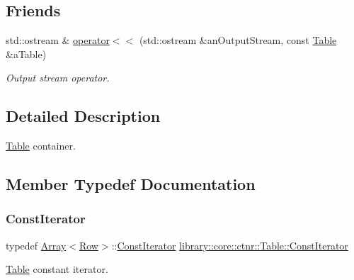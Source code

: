 \subsection*{Friends}
\begin{DoxyCompactItemize}
\item 
std\+::ostream \& \hyperlink{classlibrary_1_1core_1_1ctnr_1_1_table_afaece709b2f143e4011941ae67b7adba}{operator$<$$<$} (std\+::ostream \&an\+Output\+Stream, const \hyperlink{classlibrary_1_1core_1_1ctnr_1_1_table}{Table} \&a\+Table)
\begin{DoxyCompactList}\small\item\em Output stream operator. \end{DoxyCompactList}\end{DoxyCompactItemize}


\subsection{Detailed Description}
\hyperlink{classlibrary_1_1core_1_1ctnr_1_1_table}{Table} container. 

\subsection{Member Typedef Documentation}
\mbox{\label{classlibrary_1_1core_1_1ctnr_1_1_table_a7fa78ad4e7e8d27ceab0bff51ab84fc3}} 
\subsubsection{\texorpdfstring{Const\+Iterator}{ConstIterator}}
{\footnotesize\ttfamily typedef \hyperlink{classlibrary_1_1core_1_1ctnr_1_1_array}{Array}$<$\hyperlink{classlibrary_1_1core_1_1ctnr_1_1table_1_1_row}{Row}$>$\+::\hyperlink{classlibrary_1_1core_1_1ctnr_1_1_table_a7fa78ad4e7e8d27ceab0bff51ab84fc3}{Const\+Iterator} \hyperlink{classlibrary_1_1core_1_1ctnr_1_1_table_a7fa78ad4e7e8d27ceab0bff51ab84fc3}{library\+::core\+::ctnr\+::\+Table\+::\+Const\+Iterator}}



\hyperlink{classlibrary_1_1core_1_1ctnr_1_1_table}{Table} constant iterator. 



